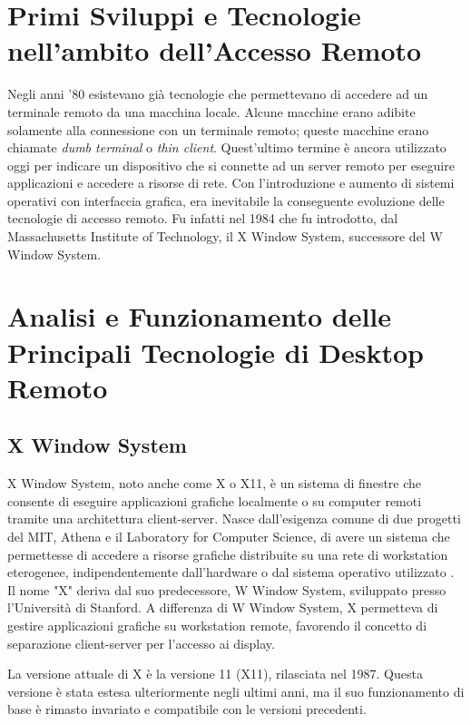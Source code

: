 \documentclass[12pt,a4paper,openright,twoside]{book}
\begin{document}
\section{Primi Sviluppi e Tecnologie nell'ambito dell'Accesso Remoto}
Negli anni '80 esistevano già tecnologie che permettevano di accedere ad un terminale remoto da una macchina locale.
Alcune macchine erano adibite solamente alla connessione con un terminale remoto;
queste macchine erano chiamate \emph{dumb terminal} o \emph{thin client}.
%
Quest'ultimo termine è ancora utilizzato oggi per indicare un dispositivo che si connette ad un server remoto per eseguire applicazioni e accedere a risorse di rete.
Con l'introduzione e aumento di sistemi operativi con interfaccia grafica, era inevitabile la conseguente evoluzione delle tecnologie di accesso remoto.
%
Fu infatti nel 1984 che fu introdotto, dal Massachusetts Institute of Technology, il X Window System, successore del W Window System.

\section{Analisi e Funzionamento delle Principali Tecnologie di Desktop Remoto} 

\subsection{X Window System}
X Window System, noto anche come X o X11, è un sistema di finestre che consente di eseguire applicazioni grafiche localmente o su computer remoti tramite una architettura client-server. 
Nasce dall'esigenza comune di due progetti del MIT,
Athena e il Laboratory for Computer Science,
di avere un sistema che permettesse di accedere a risorse grafiche distribuite su una rete di workstation eterogenee, indipendentemente dall'hardware o dal sistema operativo utilizzato \cite{Scheifler1986}.
%
Il nome "X" deriva dal suo predecessore,
W Window System,
sviluppato presso l'Università di Stanford.
%
A differenza di W Window System, X permetteva di gestire applicazioni grafiche su workstation remote, favorendo il concetto di separazione client-server per l'accesso ai display.

La versione attuale di X è la versione 11 (X11), rilasciata nel 1987.
%
Questa versione è stata estesa ulteriormente negli ultimi anni,
ma il suo funzionamento di base è rimasto invariato e compatibile con le versioni precedenti.
\end{document}

